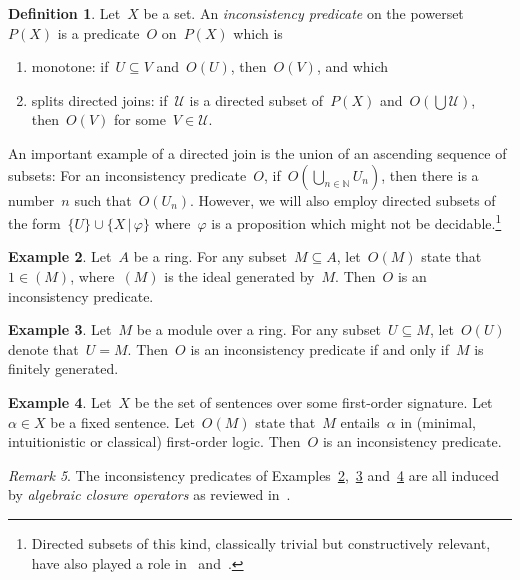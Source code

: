\documentclass[com,11pt,crcready]{iosart2x}
\theoremstyle{definition}
\newtheorem{definition}{Definition}[section]
\newtheorem{example}[definition]{Example}
\theoremstyle{plain}
\theoremstyle{remark}
\newtheorem{remark}[definition]{Remark}
\newcommand{\NN}{\mathbb{N}}
\renewcommand{\_}{\mathpunct{.}\,}
\begin{document}
\begin{definition}Let~$X$ be a set. An \emph{inconsistency predicate} on the
powerset~$P(X)$ is a predicate~$O$ on~$P(X)$ which is
\begin{enumerate}
\item monotone: if~$U \subseteq V$ and~$O(U)$, then~$O(V)$, and which
\item splits directed joins: if~$\mathcal{U}$ is a directed subset of~$P(X)$
and~$O(\bigcup \mathcal{U})$, then~$O(V)$ for some~$V \in \mathcal{U}$.
\end{enumerate}
\end{definition}

An important example of a directed join is the union of an ascending sequence
of subsets: For an inconsistency predicate~$O$, if~$O(\bigcup_{n \in \NN}
U_n)$, then there is a number~$n$ such that~$O(U_n)$. However, we will also
employ directed subsets of the form~$\{ U \} \cup \{ X \,|\, \varphi \}$
where~$\varphi$ is a proposition which might not be
decidable.\footnote{Directed subsets of this kind, classically trivial but
constructively relevant, have also played a role
in~\cite[Lemma~1]{schuster-wessel:jacincpred}
and~\cite[Example~I.1.7(2)]{moerdijk-vermeulen:proper-maps}.}

\begin{example}\label{ex:inc-ring}Let~$A$ be a ring. For any subset~$M \subseteq A$, let~$O(M)$
state that~$1 \in (M)$, where~$(M)$ is the ideal generated by~$M$. Then~$O$ is an
inconsistency predicate.\end{example}

\begin{example}\label{ex:inc-module}Let~$M$ be a module over a ring. For any subset~$U \subseteq M$,
let~$O(U)$ denote that~$U = M$. Then~$O$ is an inconsistency predicate if and
only if~$M$ is finitely generated.\end{example}

\begin{example}\label{ex:inc-formulas}Let~$X$ be the set of sentences over some first-order
signature. Let~$\alpha \in X$ be a fixed sentence. Let~$O(M)$ state that~$M$
entails~$\alpha$ in (minimal, intuitionistic or classical) first-order logic. Then~$O$ is an inconsistency
predicate.\end{example}

\begin{remark}The inconsistency predicates of
Examples~\ref{ex:inc-ring},~\ref{ex:inc-module} and~\ref{ex:inc-formulas} are
all induced by \emph{algebraic closure operators} as reviewed
in~\cite[Example~1]{wessel-schuster:radical}.\end{remark}
\end{document}
